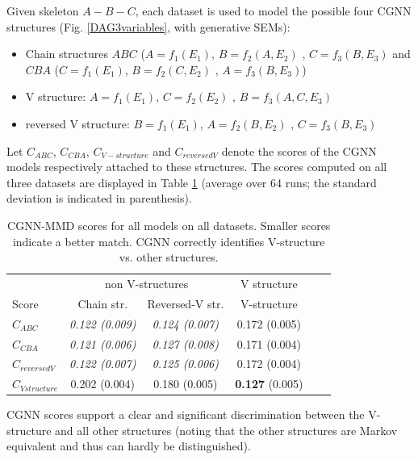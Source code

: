 \documentclass[a4paper, 11pt]{article}
\begin{document}
Given skeleton $A-B-C$, each dataset is used to model the 
possible four CGNN structures (Fig. \ref{DAG3variables}, with generative SEMs): 

\begin{itemize}
\item Chain structures $ABC$ ($A = f_1(E_1)$, $B = f_2(A,E_2)$ , $C = f_3(B,E_3)$ and $CBA$ ($C = f_1(E_1)$, $B = f_2(C,E_2)$ , $A = f_3(B,E_3)$)
\item V structure: $A = f_1(E_1)$, $C = f_2(E_2)$ , $B = f_3(A,C,E_3)$
\item reversed V structure: $B = f_1(E_1)$, $A = f_2(B,E_2)$ , $C = f_3(B,E_3)$
\end{itemize}

Let $C_{ABC}$, $C_{CBA}$, 
$C_{V-structure}$ and $C_{reversed V}$ denote the scores of the CGNN models respectively attached to these structures. The scores computed on all three  datasets are displayed in Table \ref{resultMarkov} (average over 64 runs; the standard deviation is indicated in parenthesis).


\begin{table}[!h]
 
  \label{table:acc_graph}
  \centering
  \begin{tabular}{l|cc|ccc}
    \toprule

     & \multicolumn{2}{c|}{non V-structures} & V structure \\
   Score & Chain str. & 
    Reversed-V str. & V-structure \\
    \midrule
    $C_{ABC}$ & \textit{0.122 (0.009)} & 
    \textit{0.124 (0.007)} &  0.172 (0.005) \\
    $C_{CBA}$ & \textit{0.121 (0.006)} & 
    \textit{0.127 (0.008)} & 0.171 (0.004)  \\
    $C_{reversed V}$ & \textit{0.122 (0.007)} & 
    \textit{0.125 (0.006)} &  0.172 (0.004) \\ \hline
    $C_{Vstructure}$ & 0.202 (0.004) & 
    0.180 (0.005)   & \textbf{0.127} (0.005) \\
  \end{tabular}
  \caption{CGNN-MMD scores for all models on all datasets. Smaller scores indicate a better match. CGNN correctly identifies V-structure vs. other structures.}
  \label{resultMarkov}
\end{table}

CGNN scores support a clear and significant discrimination between the V-structure and all other structures (noting that the other structures are Markov equivalent and thus can hardly be distinguished). 
\end{document}
